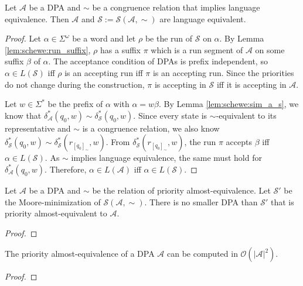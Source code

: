 \begin{lem}
	Let $\mathcal{A}$ be a DPA and $\sim$ be a congruence relation that implies language equivalence. Then $\mathcal{A}$ and $\mathcal{S} := \mathcal{S}(\mathcal{A}, \sim)$ are language equivalent.
\end{lem}

\begin{proof}
	Let $\alpha \in \Sigma^\omega$ be a word and let $\rho$ be the run of $\mathcal{S}$ on $\alpha$. By Lemma \ref{lem:schewe:run_suffix}, $\rho$ has a suffix $\pi$ which is a run segment of $\mathcal{A}$ on some suffix $\beta$ of $\alpha$. The acceptance condition of DPAs is prefix independent, so $\alpha \in L(\mathcal{S})$ iff $\rho$ is an accepting run iff $\pi$ is an accepting run. Since the priorities do not change during the construction, $\pi$ is accepting in $\mathcal{S}$ iff it is accepting in $\mathcal{A}$.
	
	Let $w \in \Sigma^*$ be the prefix of $\alpha$ with $\alpha = w \beta$. By Lemma \ref{lem:schewe:sim_a_s}, we know that $\delta^*_\mathcal{A}(q_0, w) \sim \delta^*_\mathcal{S}(q_0, w)$. Since every state is $\sim$-equivalent to its representative and $\sim$ is a congruence relation, we also know $\delta^*_\mathcal{S}(q_0, w) \sim \delta^*_\mathcal{S}(r_{[q_0]_\sim}, w)$. From $\delta^*_\mathcal{S}(r_{[q_0]_\sim}, w)$, the run $\pi$ accepts $\beta$ iff $\alpha \in L(\mathcal{S})$. As $\sim$ implies language equivalence, the same must hold for $\delta^*_\mathcal{A}(q_0, w)$. Therefore, $\alpha \in L(\mathcal{A})$ iff $\alpha \in L(\mathcal{S})$.
\end{proof}


\begin{lem}
	Let $\mathcal{A}$ be a DPA and $\sim$ be the relation of priority almost-equivalence. Let $\mathcal{S}'$ be the Moore-minimization of $\mathcal{S}(\mathcal{A}, \sim)$. There is no smaller DPA than $\mathcal{S}'$ that is priority almost-equivalent to $\mathcal{A}$.
\end{lem}

\begin{proof}
\end{proof}


\begin{lem}
	The priority almost-equivalence of a DPA $\mathcal{A}$ can be computed in $\mathcal{O}(|\mathcal{A}|^2)$.
\end{lem}

\begin{proof}
\end{proof}


